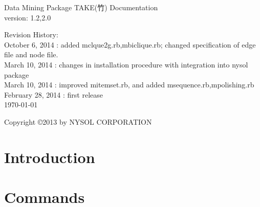\documentclass[a4paper]{book}
\begin{document}
\begin{titlepage}
\begin{center}
{\huge Data Mining Package TAKE(竹) Documentation}\\
\vspace{10truept}
{\normalsize version: 1.2,2.0}\\
\vspace{1cm}

Revision History:\\

October 6, 2014 : added mclque2g.rb,mbiclique.rb; changed specification of edge file and node file. \\
March 10, 2014 : changes in installation procedure with integration into nysol package\\
March 10, 2014 : improved mitemset.rb, and added msequence.rb,mpolishing.rb\\
February 28, 2014 : first release\\
\vspace{18cm}
{\small \today}

{\small Copyright \copyright 2013 by NYSOL CORPORATION}
\end{center}
\end{titlepage}

\setcounter{tocdepth}{1}
\tableofcontents




\chapter{Introduction}



\chapter{Commands}












%
%

\end{document}
